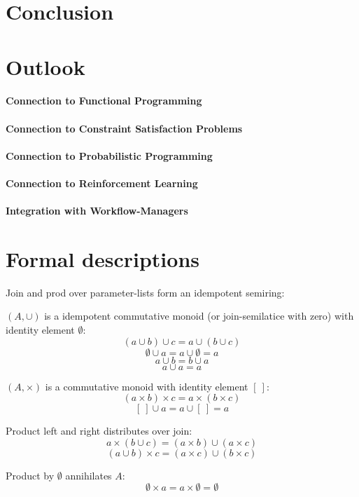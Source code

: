 \documentclass[english]{article}
\begin{document}
\section{Conclusion}

\section{Outlook}
\paragraph{Connection to Functional Programming}
\paragraph{Connection to Constraint Satisfaction Problems}
\paragraph{Connection to Probabilistic Programming}
\paragraph{Connection to Reinforcement Learning}
\paragraph{Integration with Workflow-Managers}

\appendix



\section{Formal descriptions}
Join and prod over parameter-lists form an idempotent semiring:

$(A, \cup)$ is a idempotent commutative monoid (or join-semilatice with zero) with identity element $\emptyset$:
$$(a \cup b) \cup c = a \cup (b \cup c)$$
$$\emptyset \cup a = a \cup \emptyset = a$$
$$a \cup b = b \cup a$$
$$a \cup a = a$$

$(A, \times)$ is a commutative monoid with identity element $[\ ]$:
$$(a \times b) \times c = a \times (b \times c)$$
$$[\ ] \cup a = a \cup [\ ] = a$$

Product left and right distributes over join:
$$a\times(b \cup c) = (a\times b) \cup (a\times c)$$
$$(a \cup b)\times c = (a\times c) \cup (b\times c)$$

Product by $\emptyset$ annihilates $A$:
$$\emptyset \times a = a \times \emptyset = \emptyset$$



\printbibliography
\end{document}
